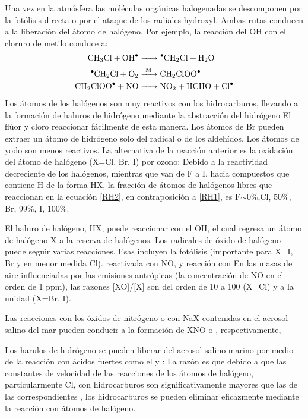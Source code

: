 Una vez en la atmósfera las moléculas orgánicas halogenadas se descomponen por la fotólisis directa o por el ataque de los radiales hydroxyl. Ambas rutas conducen a la liberación del átomo de halógeno. Por ejemplo, la reacción del OH con el cloruro de metilo conduce a:
\begin{align*}
\ce{CH3Cl + OH^. &->  ^.CH2Cl + H2O \\
      ^.CH2Cl + O2 & ->[M] CH2ClOO^. \\
      CH2ClOO^. + NO & -> NO2 + HCHO + Cl^. }
\end{align*}
Los átomos de los halógenos son muy reactivos con los hidrocarburos, llevando a la formación de haluros de hidrógeno mediante la abstracción del hidrógeno 
El flúor y cloro reaccionar fácilmente de esta manera. Los átomos de Br pueden extraer un átomo de hidrógeno solo del radical   o de los aldehídos. Los átomos de yodo son menos reactivos. La alternativa de la reacción anterior es la oxidación del átomo de halógeno (X=Cl, Br, I) por ozono:
Debido a la reactividad decreciente de los halógenos, mientras que van de F a I, hacia compuestos que contiene H de la forma HX, la fracción de átomos de halógenos libres que reaccionan en la ecuación \ref{RH2}, en contraposición a \ref{RH1}, es F$\sim$0\%,Cl, 50\%, Br, 99\%, I, 100\%.

El haluro de halógeno, HX, puede reaccionar con el OH,
el cual regresa un átomo de halógeno X a la reserva de halógenos. Los radicales de óxido de halógeno puede seguir varias reacciones. Esas incluyen la fotólisis (importante para X=I, Br y en menor medida Cl).
reactivada con NO,
y reacción con 
En las masas de aire influenciadas por las emisiones antrópicas (la concentración de NO en el orden de 1 ppm), las razones [XO]/[X] son del orden de 10 a 100 (X=Cl) y a la unidad (X=Br, I).

Las reacciones con los óxidos de nitrógeno  o  con NaX contenidas en el aerosol salino del mar pueden conducir a la formación de XNO o , respectivamente,

Los harulos de hidrógeno se pueden liberar del aerosol salino marino por medio de la reacción con ácidos fuertes como el  y :
La razón es que debido a que las constantes de velocidad de las reacciones de los átomos de halógeno, particularmente Cl, con hidrocarburos son significativamente mayores que las de las correspondientes , los hidrocarburos se pueden eliminar eficazmente mediante la reacción con átomos de halógeno.


